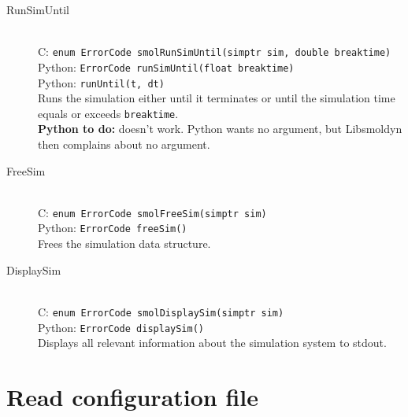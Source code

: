 \documentclass {book}
\newcommand {\ttt} {\texttt}
\begin{document}
\begin{description}
\item[RunSimUntil]
\hfill \\
C: \ttt{enum ErrorCode smolRunSimUntil(simptr sim, double breaktime)}\\
Python: \ttt{ErrorCode runSimUntil(float breaktime)}\\
Python: \ttt{runUntil(t, dt)}\\
Runs the simulation either until it terminates or until the simulation time equals or exceeds \ttt{breaktime}.\\
\textbf{Python to do:} doesn't work. Python wants no argument, but Libsmoldyn then complains about no argument.

\item[FreeSim]
\hfill \\
C: \ttt{enum ErrorCode smolFreeSim(simptr sim)}\\
Python: \ttt{ErrorCode freeSim()}\\
Frees the simulation data structure.

\item[DisplaySim]
\hfill \\
C: \ttt{enum ErrorCode smolDisplaySim(simptr sim)}\\
Python: \ttt{ErrorCode displaySim()}\\
Displays all relevant information about the simulation system to stdout.

\end{description}

\section{Read configuration file}
\end{document}
